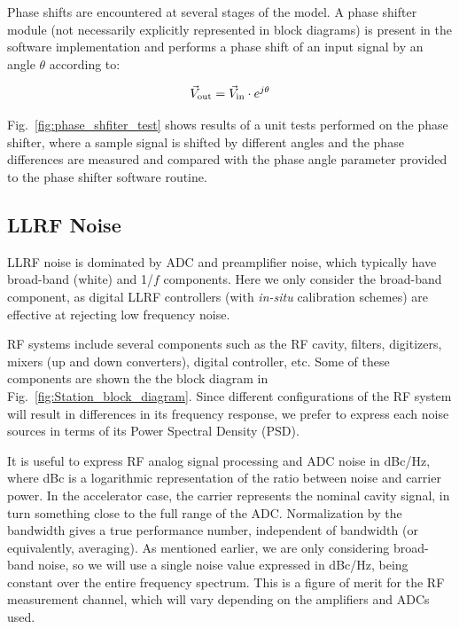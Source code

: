 \documentclass[a4paper,12pt]{article}
\begin{document}
Phase shifts are encountered at several stages of the model. A phase shifter module (not necessarily explicitly represented in block diagrams) is present in the software implementation and performs a phase shift of an input signal by an angle $\theta$ according to:

\begin{equation}
  \vec V_{\rm out} = \vec V_{\rm in} \cdot e^{j\theta}
\end{equation}

Fig.~\ref{fig:phase_shfiter_test} shows results of a unit tests performed on the phase shifter, where a sample signal is shifted by different angles and the phase differences are measured and compared with the phase angle parameter provided to the phase shifter software routine.

\subsection{LLRF Noise}

LLRF noise is dominated by ADC and preamplifier noise, which typically have broad-band (white) and 1/$f$ components. Here we only consider the broad-band component, as digital LLRF controllers (with {\it in-situ} calibration schemes) are effective at rejecting low frequency noise.

RF systems include several components such as the RF cavity, filters, digitizers, mixers (up and down converters), digital controller, etc. Some of these components are shown the the block diagram in Fig.~\ref{fig:Station_block_diagram}. Since different configurations of the RF system will result in differences in its frequency response, we prefer to express each noise sources in terms of its Power Spectral Density (PSD).

It is useful to express RF analog signal processing and ADC noise in dBc/Hz, where dBc is a logarithmic representation of the ratio between noise and carrier power. In the accelerator case, the carrier represents the nominal cavity signal, in turn something close to the full range of the \hbox{ADC}.  Normalization by the bandwidth gives a true performance number, independent of bandwidth (or equivalently, averaging). As mentioned earlier, we are only considering broad-band noise, so we will use a single noise value expressed in dBc/Hz, being constant over the entire frequency spectrum. This is a figure of merit for the RF measurement channel, which will vary depending on the amplifiers and ADCs used.
\end{document}
